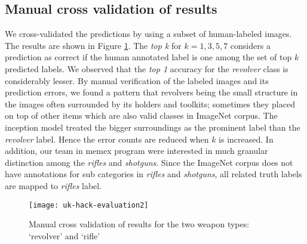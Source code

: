 \subsection{Manual cross validation of results}
We cross-validated the predictions by using a subset of human-labeled images. The results are shown in Figure \ref{fig:uk-hack-eval}. The \textit{top k} for $k=1,3,5,7$ considers a prediction as correct if the human annotated label is one among the set of top $k$  predicted labels. We observed that the \textit{top 1} accuracy for the \textit{revolver} class is considerably lesser. By manual verification of the labeled images and its prediction errors, we found a pattern that revolvers being the small structure in the images often surrounded by its holders and toolkits; sometimes they placed on top of other items which are also valid classes in ImageNet corpus. The inception model treated the bigger surroundings as the prominent label than the \textit{revolver} label. Hence the error counts are reduced when $k$ is increased. In addition, our team in memex program were interested in much granular distinction among the \textit{rifles} and \textit{shotguns}. Since the ImageNet corpus does not have annotations for sub categories in \textit{rifles} and \textit{shotguns}, all related truth labels are mapped to \textit{rifles} label. 

\begin{figure}[h]
	\texttt{[image: uk-hack-evaluation2]}
	\caption{Manual cross validation of results for the two weapon types: `revolver' and `rifle'}
	\label{fig:uk-hack-eval}
\end{figure}

